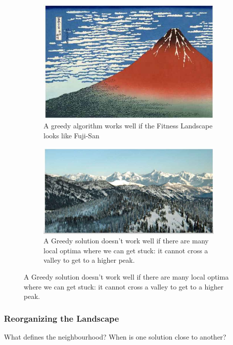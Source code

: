 \documentclass[]{article}
\begin{document}
\begin{figure}[H]
	\caption{Greedy Algorithms and the Fitness Landscape}
	\begin{subfigure}[t]{0.4\textwidth}
		\caption{A greedy algorithm works well if the Fitness Landscape looks like Fuji-San}
		\includegraphics[width=\textwidth]{fujisan}
	\end{subfigure}
	\;\;\;
	\begin{subfigure}[t]{0.55\textwidth}
		\caption{A Greedy solution doesn't work well if there are many local optima where we can get stuck: it cannot cross a valley to get to a higher peak.}
		\includegraphics[width=\textwidth]{rockies}
	\end{subfigure}
\end{figure}

\subsubsection{Reorganizing the Landscape}

What defines the neighbourhood? When is one solution close to another?
\end{document}

